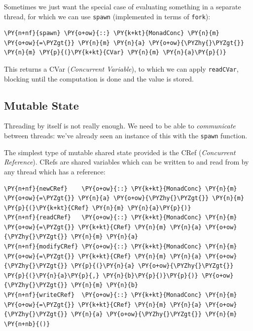 Sometimes we just want the special case of evaluating something in a
separate thread, for which we can use \texttt{spawn} (implemented in
terms of \texttt{fork}):


\begin{Verbatim}[commandchars=\\\{\}]
\PY{n+nf}{spawn} \PY{o+ow}{::} \PY{k+kt}{MonadConc} \PY{n}{m} \PY{o+ow}{=\PYZgt{}} \PY{n}{m} \PY{n}{a} \PY{o+ow}{\PYZhy{}\PYZgt{}} \PY{n}{m} \PY{p}{(}\PY{k+kt}{CVar} \PY{n}{m} \PY{n}{a}\PY{p}{)}
\end{Verbatim}

This returns a CVar (\textit{Concurrent Variable}), to which we can
apply \texttt{readCVar}, blocking until the computation is done and
the value is stored.

\subsection*{Mutable State}
\label{sec:dejafu-conc-crefs}

Threading by itself is not really enough. We need to be able to
\textit{communicate} between threads: we've already seen an instance
of this with the \texttt{spawn} function.

The simplest type of mutable shared state provided is the CRef
(\textit{Concurrent Reference}). CRefs are shared variables which can
be written to and read from by any thread which has a reference:


\begin{Verbatim}[commandchars=\\\{\}]
\PY{n+nf}{newCRef}    \PY{o+ow}{::} \PY{k+kt}{MonadConc} \PY{n}{m} \PY{o+ow}{=\PYZgt{}} \PY{n}{a} \PY{o+ow}{\PYZhy{}\PYZgt{}} \PY{n}{m} \PY{p}{(}\PY{k+kt}{CRef} \PY{n}{m} \PY{n}{a}\PY{p}{)}
\PY{n+nf}{readCRef}   \PY{o+ow}{::} \PY{k+kt}{MonadConc} \PY{n}{m} \PY{o+ow}{=\PYZgt{}} \PY{k+kt}{CRef} \PY{n}{m} \PY{n}{a} \PY{o+ow}{\PYZhy{}\PYZgt{}} \PY{n}{m} \PY{n}{a}
\PY{n+nf}{modifyCRef} \PY{o+ow}{::} \PY{k+kt}{MonadConc} \PY{n}{m} \PY{o+ow}{=\PYZgt{}} \PY{k+kt}{CRef} \PY{n}{m} \PY{n}{a} \PY{o+ow}{\PYZhy{}\PYZgt{}} \PY{p}{(}\PY{n}{a} \PY{o+ow}{\PYZhy{}\PYZgt{}} \PY{p}{(}\PY{n}{a}\PY{p}{,} \PY{n}{b}\PY{p}{)}\PY{p}{)} \PY{o+ow}{\PYZhy{}\PYZgt{}} \PY{n}{m} \PY{n}{b}
\PY{n+nf}{writeCRef}  \PY{o+ow}{::} \PY{k+kt}{MonadConc} \PY{n}{m} \PY{o+ow}{=\PYZgt{}} \PY{k+kt}{CRef} \PY{n}{m} \PY{n}{a} \PY{o+ow}{\PYZhy{}\PYZgt{}} \PY{n}{a} \PY{o+ow}{\PYZhy{}\PYZgt{}} \PY{n}{m} \PY{n+nb}{()}
\end{Verbatim}

